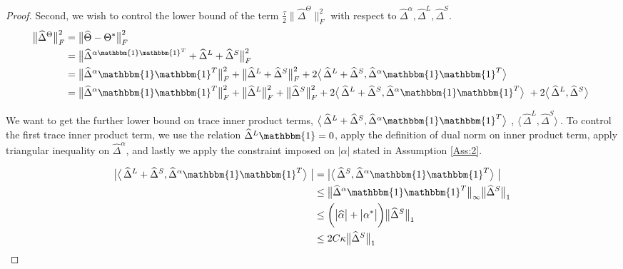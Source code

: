 \documentclass[AMS,STIX1COL]{WileyNJD-v2}
\begin{document}
{\begin{proof}
Second, we wish to control the lower bound of the term  $\frac{\tau}{2}\big\|\widehat{\Delta}^{\Theta}\big\|_{F}^{2}$ with respect to $\widehat{\Delta}^{\alpha},\widehat{\Delta}^{L},\widehat{\Delta}^{S}$.
\begin{align}
\big\|\widehat{\Delta}^{\Theta}\big\|_{F}^{2}  \nonumber
&= \big\|\widehat{\Theta}-\Theta^{*} \big\|_{F}^{2} \\ \nonumber
&= \big\|\widehat\Delta^{\alpha\mathbbm{1}\mathbbm{1}^T} + \widehat\Delta^{L} + \widehat\Delta^{S}\big\|_{F}^{2} \\ \nonumber
&= \big\|\widehat{\Delta}^{\alpha}\mathbbm{1}\mathbbm{1}^T\big\|_{F}^{2} + \big\|\widehat{\Delta}^{L}+\widehat{\Delta}^{S}\big\|_{F}^{2} +
2 \big\langle\, \widehat\Delta^{L} + \widehat\Delta^{S} ,\widehat{\Delta}^{\alpha}\mathbbm{1}\mathbbm{1}^T \big\rangle\ \\
&=  \big\|\widehat{\Delta}^{\alpha}\mathbbm{1}\mathbbm{1}^T\big\|_{F}^{2} + \big\|\widehat{\Delta}^{L}\big\|_{F}^{2} + \big\|\widehat{\Delta}^{S}\big\|_{F}^{2} +
2 \big\langle\, \widehat\Delta^{L} + \widehat\Delta^{S} ,\widehat{\Delta}^{\alpha}\mathbbm{1}\mathbbm{1}^T \big\rangle\ +
2 \big\langle\, \widehat\Delta^{L}, \widehat\Delta^{S} \big\rangle\  \label{eq:12}
\end{align}

We want to get the further lower bound on trace inner product terms,
$ \big\langle\, \widehat\Delta^{L} + \widehat\Delta^{S} ,\widehat{\Delta}^{\alpha}\mathbbm{1}\mathbbm{1}^T \big\rangle\ $, $ \big\langle\, \widehat\Delta^{L}, \widehat\Delta^{S} \big\rangle\ $. To control the first trace inner product term, we use the relation $\widehat{\Delta}^{L}\mathbbm{1}=0$, apply the definition of dual norm on inner product term, apply triangular inequality on $\widehat{\Delta}^\alpha$, and lastly we apply the constraint imposed on $|\alpha|$ stated in Assumption \ref{Ass:2}.

\begin{align}
    \big| \big\langle\, \widehat\Delta^{L} + \widehat\Delta^{S} ,\widehat{\Delta}^{\alpha}\mathbbm{1}\mathbbm{1}^T\big\rangle\ \big| \nonumber
    &= \big| \big\langle\,\widehat\Delta^{S},\widehat{\Delta}^{\alpha}\mathbbm{1}\mathbbm{1}^T\big\rangle\ \big| \\ \nonumber
    &\leq \big\|\widehat{\Delta}^{\alpha}\mathbbm{1}\mathbbm{1}^T \big\|_{\infty} \big\|\widehat{\Delta}^{S}\big\|_1 \\ \nonumber
    &\leq \bigg(\big|\widehat{\alpha}\big|+\big|\alpha^{*}\big|\bigg)\big\|\widehat{\Delta}^{S}\big\|_1\\
    &\leq 2C\kappa\big\|\widehat{\Delta}^{S}\big\|_1  \label{eq:13}
\end{align}


\end{proof}}
\end{document}
